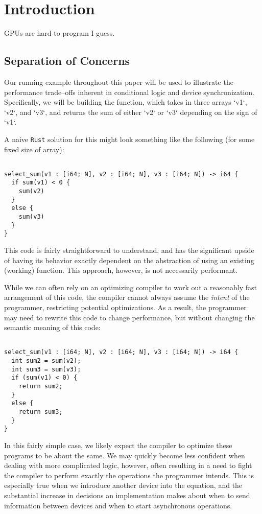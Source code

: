 \section{Introduction}
\label{sec:intro}

GPUs are hard to program I guess.

\subsection{Separation of Concerns}
\label{subsec:separation}

Our running example throughout this paper will be used to illustrate the performance trade--offs inherent in conditional logic and device synchronization.  Specifically, we will be building the  function, which takes in three arrays `v1`, `v2`, and `v3`, and returns the sum of either `v2` or `v3` depending on the sign of `v1`.

A naive \texttt{Rust} solution for this might look something like the following (for some fixed size of array):
%
\begin{lstlisting}

select_sum(v1 : [i64; N], v2 : [i64; N], v3 : [i64; N]) -> i64 {
  if sum(v1) < 0 {
    sum(v2)
  } 
  else {
    sum(v3)
  }
}
\end{lstlisting}
%
This code is fairly straightforward to understand, and has the significant upside of having its behavior exactly dependent on the abstraction of using an existing (working) function.
This approach, however, is not necessarily performant.

While we can often rely on an optimizing compiler to work out a reasonably fast arrangement of this code, the compiler cannot always assume the \textit{intent} of the programmer, restricting potential optimizations.
As a result, the programmer may need to rewrite this code to change performance, but without changing the semantic meaning of this code:
%
\begin{lstlisting}

select_sum(v1 : [i64; N], v2 : [i64; N], v3 : [i64; N]) -> i64 {
  int sum2 = sum(v2);
  int sum3 = sum(v3);
  if (sum(v1) < 0) {
    return sum2;
  } 
  else {
    return sum3;
  }
}
\end{lstlisting}
%
In this fairly simple case, we likely expect the compiler to optimize these programs to be about the same.  We may quickly become less confident when dealing with more complicated logic, however, often resulting in a need to fight the compiler to perform exactly the operations the programmer intends.  This is especially true when we introduce another device into the equation, and the substantial increase in decisions an implementation makes about when to send information between devices and when to start asynchronous operations.

